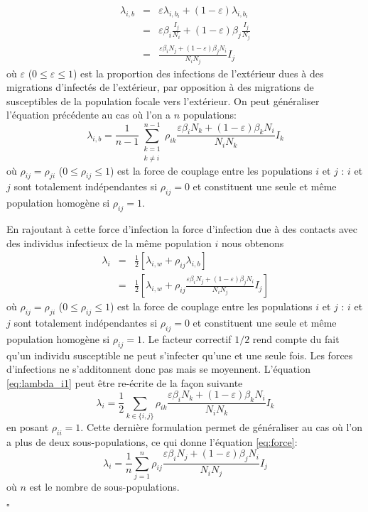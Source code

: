\documentclass[a4paper,10pt]{article}
\begin{document}
\begin{eqnarray}
  \lambda_{i,b} & = & \varepsilon \lambda_{i,b_i} + (1 - \varepsilon) \lambda_{i,b_i} \\
                & = & \varepsilon \beta_i \frac{I_j}{N_i} + (1 - \varepsilon) \beta_j \frac{I_j}{N_j} \\
                & = & \frac{\varepsilon \beta_iN_j+(1-\varepsilon)\beta_jN_i}{N_i N_j}I_j
\end{eqnarray}
où $\varepsilon$ ($0 \leqslant \varepsilon \leqslant 1$) est la proportion des infections de l'extérieur dues à des migrations d'infectés de l'extérieur, par opposition à des migrations de susceptibles de la population focale vers l'extérieur. On peut généraliser l'équation précédente au cas où l'on a $n$ populations:
\begin{equation}
  \lambda_{i,b} = \frac{1}{n-1}\sum_{\substack{
   k=1 \\
   k\neq i
  }}^{n-1}\rho_{ik}\frac{\varepsilon \beta_iN_k+(1-\varepsilon)\beta_kN_i}{N_i N_k}I_k
\end{equation}
où $\rho_{ij}=\rho_{ji}$ ($0\leqslant\rho_{ij}\leqslant1$) est la force de couplage entre les populations $i$ et $j$ : $i$ et $j$ sont totalement indépendantes si $\rho_{ij}=0$ et constituent une seule et même population homogène si $\rho_{ij}=1$.

En rajoutant à cette force d'infection la force d'infection due à des contacts avec des individus infectieux de la même population $i$ nous obtenons
\begin{eqnarray}
  \lambda_i & = & \frac{1}{2} [\lambda_{i,w} + \rho_{ij}\lambda_{i,b}] \\
            & = & \frac{1}{2} \left[\lambda_{i,w} + \rho_{ij}\frac{\varepsilon \beta_iN_j+(1-\varepsilon)\beta_jN_i}{N_i N_j}I_j\right] \label{eq:lambda_i1}
\end{eqnarray}
où $\rho_{ij}=\rho_{ji}$ ($0\leqslant\rho_{ij}\leqslant1$) est la force de couplage entre les populations $i$ et $j$ : $i$ et $j$ sont totalement indépendantes si $\rho_{ij}=0$ et constituent une seule et même population homogène si $\rho_{ij}=1$. Le facteur correctif $1/2$ rend compte du fait qu'un individu susceptible ne peut s'infecter qu'une et une seule fois. Les forces d'infections ne s'additonnent donc pas mais se moyennent. L'équation \ref{eq:lambda_i1} peut être re-écrite de la façon suivante
\begin{equation}
  \lambda_i = \frac{1}{2}\sum_{k\in\{i,j\}}\rho_{ik}\frac{\varepsilon \beta_iN_k+(1-\varepsilon)\beta_kN_i}{N_i N_k}I_k
\end{equation}
en posant $\rho_{ii}=1$. Cette dernière formulation permet de généraliser au cas où l'on a plus de deux sous-populations, ce qui donne l'équation \ref{eq:force}:
$$
  \lambda_i = \frac{1}{n}\sum_{j=1}^n\rho_{ij}\frac{\varepsilon \beta_iN_j+(1-\varepsilon)\beta_jN_i}{N_i N_j}I_j
$$
où $n$ est le nombre de sous-populations.

\hfill$\square$
\end{document}
